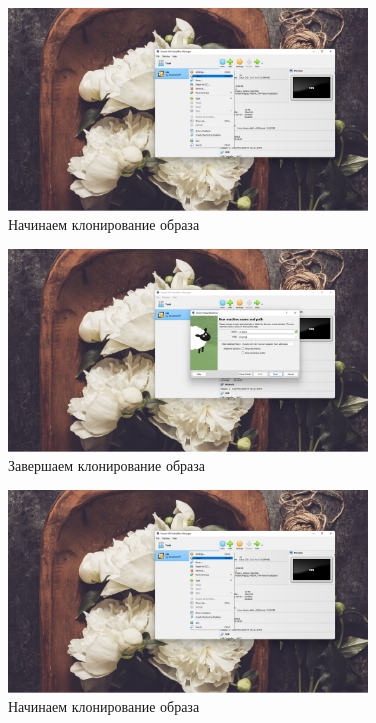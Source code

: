 \documentclass[a4paper]{article}
\begin{document}
  \begin{figure}[H]
    \centering
    \includegraphics[width=0.85\textwidth]{01_00 (1)}
    \caption{Начинаем клонирование образа}
  \end{figure}
  
  \begin{figure}[H]
    \centering
    \includegraphics[width=0.85\textwidth]{01_00 (2)}
    \caption{Завершаем клонирование образа}
  \end{figure}

  \begin{figure}[H]
    \centering
    \includegraphics[width=0.85\textwidth]{01_00 (1)}
    \caption{Начинаем клонирование образа}
  \end{figure}
\end{document}
